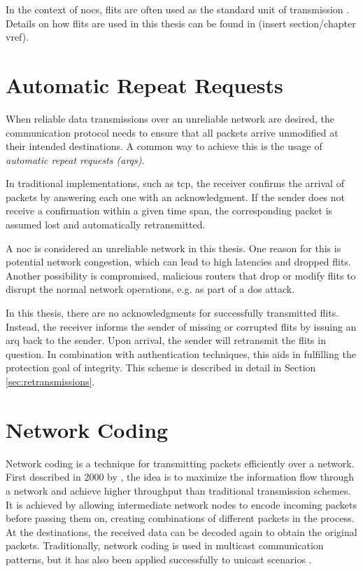 In the context of \glspl{noc}, flits are often used as the standard unit of transmission \cite[51\psqq]{tatas16designingnocs}. Details on how flits
are used in this thesis can be found in (insert section/chapter vref).

\section{Automatic Repeat Requests}\label{sec:arqs}
When reliable data transmissions over an unreliable network are desired, the communication protocol needs to ensure that all packets arrive unmodified
at their intended destinations. A common way to achieve this is the usage of \textit{automatic repeat requests (\glspl{arq})}.

In traditional implementations, such as \gls{tcp}, the receiver confirms the arrival of packets by answering each one with an acknowledgment.
If the sender does not receive a confirmation within a given time span, the corresponding packet is assumed lost and automatically retransmitted.

A \gls{noc} is considered an unreliable network in this thesis. One reason for this is potential network congestion, which can lead to high latencies
and dropped flits. Another possibility is compromised, malicious routers that drop or modify flits to disrupt the normal network operations, e.g. as part of a
\gls{dos} attack.

In this thesis, there are no acknowledgments for successfully transmitted flits. Instead, the receiver informs the sender of missing or corrupted
flits by issuing an \gls{arq} back to the sender. Upon arrival, the sender will retransmit the flits in question. In combination with
authentication techniques, this aids in fulfilling the protection goal of integrity. This scheme is described in detail in Section
\ref{sec:retransmissions}.

\section{Network Coding}\label{sec:networkcodingfun}
Network coding is a technique for transmitting packets efficiently over a network. First described in 2000 by \citeauthor{ahlswede00networkflow}
\cite{ahlswede00networkflow}, the idea is to maximize the information flow through a network and achieve higher throughput than traditional transmission
schemes. It is achieved by allowing intermediate network nodes to encode incoming packets before passing them on, creating combinations of different
packets in the process. At the destinations, the received data can be decoded again to obtain the original packets. Traditionally, network coding is
used in multicast communication patterns, but it has also been applied successfully to unicast scenarios \cite[e.g.][]{moriam15manycorenc}.

